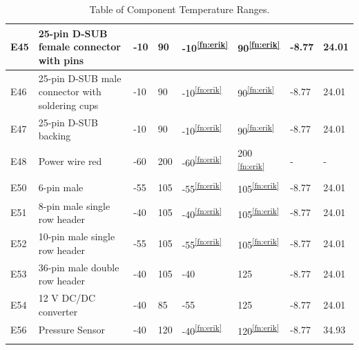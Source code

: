 \documentclass[a4paper,12pt,twoside]{article}
\begin{document}
\begin{longtable}{|m{1cm}|m{3.5cm}|m{1.3cm}|m{1.3cm}|m{1.4cm}|m{1.3cm}|m{1.3cm}|m{1.3cm}|}
E45 & 25-pin D-SUB female connector with pins & -10 & 90 & -10\textsuperscript{\ref{fn:erik}} & 90\textsuperscript{\ref{fn:erik}} & -8.77 & 24.01 \\ \hline
E46 & 25-pin D-SUB male connector with soldering cups & -10 & 90 & -10\textsuperscript{\ref{fn:erik}} & 90\textsuperscript{\ref{fn:erik}} & -8.77 & 24.01 \\ \hline
E47 & 25-pin D-SUB backing & -10 & 90 & -10\textsuperscript{\ref{fn:erik}} & 90\textsuperscript{\ref{fn:erik}} & -8.77 & 24.01 \\ \hline
E48 & Power wire red & -60 & 200 & -60\textsuperscript{\ref{fn:erik}} & 200
\textsuperscript{\ref{fn:erik}} & - & -  \\ \hline
E50 & 6-pin male & -55 & 105 & -55\textsuperscript{\ref{fn:erik}} & 105\textsuperscript{\ref{fn:erik}} & -8.77 & 24.01  \\ \hline
E51 & 8-pin male single row header& -40 & 105 & -40\textsuperscript{\ref{fn:erik}} & 105\textsuperscript{\ref{fn:erik}} & -8.77 & 24.01  \\ \hline
E52 & 10-pin male single row header & -55 & 105 & -55\textsuperscript{\ref{fn:erik}} & 105\textsuperscript{\ref{fn:erik}} & -8.77 & 24.01  \\ \hline
E53 & 36-pin male double row header & -40 & 105 & -40 & 125 & -8.77 & 24.01  \\ \hline
E54 & 12 V DC/DC converter & -40 & 85 & -55 & 125 & -8.77 & 24.01  \\ \hline
E56 & Pressure Sensor & -40 & 120 & -40\textsuperscript{\ref{fn:erik}} & 120\textsuperscript{\ref{fn:erik}} &  -8.77 & 34.93 \\ \hline


\caption{Table of Component Temperature Ranges.}
\label{tab:thermal-table}
\end{longtable}
\end{document}
